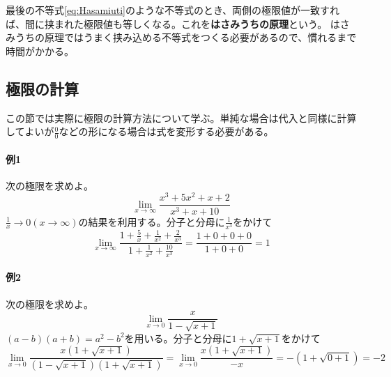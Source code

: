 \documentclass[a4j,dvipdfmx]{jsarticle}
\begin{document}
                最後の不等式\eqref{eq:Hasamiuti}のような不等式のとき、両側の極限値が一致すれば、間に挟まれた極限値も等しくなる。これを\textbf{はさみうちの原理}という。
                はさみうちの原理ではうまく挟み込める不等式をつくる必要があるので、慣れるまで時間がかかる。

            \clearpage
            \subsection{極限の計算}
                この節では実際に極限の計算方法について学ぶ。単純な場合は代入と同様に計算してよいが$\frac{0}{0}$などの形になる場合は式を変形する必要がある。

                \paragraph{例1}次の極限を求めよ。
                    \begin{equation*}
                        \lim_{x\to \infty}\frac{x^3+5x^2+x+2}{x^3+x+10}
                    \end{equation*}
                    $\frac{1}{x}\to 0(x\to \infty)$の結果を利用する。分子と分母に$\frac{1}{x^3}$をかけて
                    \begin{equation*}
                        \lim_{x\to \infty}\frac{1+\frac{5}{x}+\frac{1}{x^2}+\frac{2}{x^3}}{1+\frac{1}{x^2}+\frac{10}{x^3}}=\frac{1+0+0+0}{1+0+0}=1
                    \end{equation*}
                
                \paragraph{例2}次の極限を求めよ。
                    \begin{equation*}
                        \lim_{x\to 0}\frac{x}{1-\sqrt{x+1}}
                    \end{equation*}
                    $(a-b)(a+b)=a^2-b^2$を用いる。分子と分母に$1+\sqrt{x+1}$をかけて
                    \begin{equation*}
                        \lim_{x\to 0}\frac{x(1+\sqrt{x+1})}{(1-\sqrt{x+1})(1+\sqrt{x+1})}=\lim_{x\to 0}\frac{x(1+\sqrt{x+1})}{-x}=-(1+\sqrt{0+1})=-2
                    \end{equation*}
                
\end{document}
